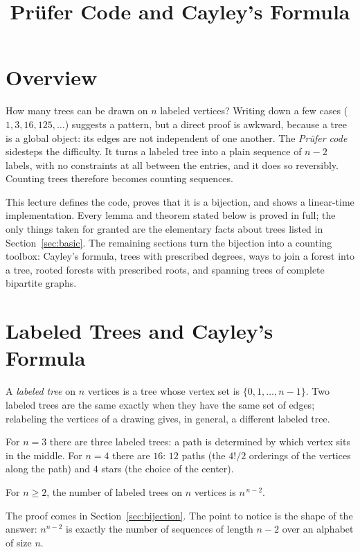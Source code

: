 \documentclass[11pt]{article}
\title{Prüfer Code and Cayley's Formula}
\author{}
\date{}
\begin{document}
\thispagestyle{fancy}


\section{Overview}
How many trees can be drawn on $n$ labeled vertices? Writing down a few
cases ($1, 3, 16, 125, \dots$) suggests a pattern, but a direct proof is
awkward, because a tree is a global object: its edges are not independent
of one another. The \emph{Prüfer code} sidesteps the difficulty. It
turns a labeled tree into a plain sequence of $n-2$ labels, with no
constraints at all between the entries, and it does so reversibly.
Counting trees therefore becomes counting sequences.

This lecture defines the code, proves that it is a bijection, and shows a
linear-time implementation. Every lemma and theorem stated below is proved
in full; the only things taken for granted are the elementary facts about
trees listed in Section~\ref{sec:basic}. The remaining sections turn the bijection into
a counting toolbox: Cayley's formula, trees with prescribed degrees, ways
to join a forest into a tree, rooted forests with prescribed roots, and
spanning trees of complete bipartite graphs.

\section{Labeled Trees and Cayley's Formula}
\begin{definitionbox}
A \emph{labeled tree} on $n$ vertices is a tree whose vertex set is
$\{0,1,\dots,n-1\}$. Two labeled trees are the same exactly when they have
the same set of edges; relabeling the vertices of a drawing gives, in
general, a different labeled tree.
\end{definitionbox}

For $n=3$ there are three labeled trees: a path is determined by which
vertex sits in the middle. For $n=4$ there are $16$: $12$ paths (the
$4!/2$ orderings of the vertices along the path) and $4$ stars (the
choice of the center).

\begin{theorembox}
For $n\ge 2$, the number of labeled trees on $n$ vertices is $n^{\,n-2}$.
\end{theorembox}

The proof comes in Section~\ref{sec:bijection}. The point to notice is the
shape of the answer: $n^{n-2}$ is exactly the number of sequences of
length $n-2$ over an alphabet of size $n$.
\end{document}
